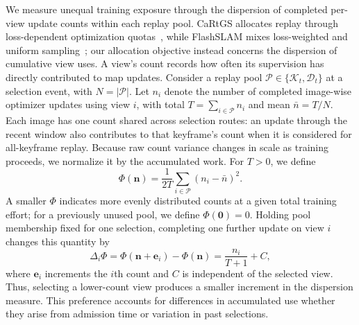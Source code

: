 We measure unequal training exposure through the dispersion of completed per-view update counts within each replay pool.
CaRtGS allocates replay through loss-dependent optimization quotas~\cite{cartgs}, while FlashSLAM mixes loss-weighted and uniform sampling~\cite{pham2024flashslam}; our allocation objective instead concerns the dispersion of cumulative view uses.
A view's count records how often its supervision has directly contributed to map updates.
Consider a replay pool $\mathcal P\in\{\mathcal K_t,\mathcal D_t\}$ at a selection event, with $N=|\mathcal P|$.
Let $n_i$ denote the number of completed image-wise optimizer updates using view $i$, with total $T=\sum_{i\in\mathcal P}n_i$ and mean $\bar n=T/N$.
Each image has one count shared across selection routes: an update through the recent window also contributes to that keyframe's count when it is considered for all-keyframe replay.
Because raw count variance changes in scale as training proceeds, we normalize it by the accumulated work.
For $T>0$, we define
\begin{equation}
  \Phi(\mathbf n)=\frac{1}{2T}
         \sum_{i\in\mathcal P}(n_i-\bar n)^2.
  \label{eq:count_dispersion}
\end{equation}
A smaller $\Phi$ indicates more evenly distributed counts at a given total training effort; for a previously unused pool, we define $\Phi(\mathbf 0)=0$.
Holding pool membership fixed for one selection, completing one further update on view $i$ changes this quantity by
\begin{equation}
  \Delta_i\Phi=\Phi(\mathbf n+\mathbf e_i)-\Phi(\mathbf n)
       =\frac{n_i}{T+1}+C,
  \label{eq:count_dispersion_increment}
\end{equation}
where $\mathbf e_i$ increments the $i$th count and $C$ is independent of the selected view.
Thus, selecting a lower-count view produces a smaller increment in the dispersion measure.
This preference accounts for differences in accumulated use whether they arise from admission time or variation in past selections.

